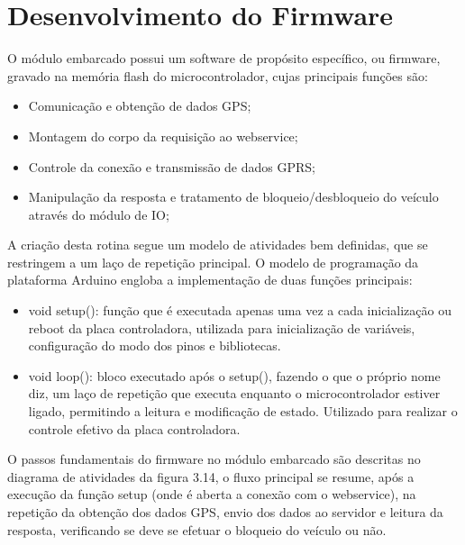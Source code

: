 \section {Desenvolvimento do Firmware}

O módulo embarcado possui um software de propósito específico, ou firmware, gravado na memória flash do microcontrolador, cujas principais funções são:

\begin{itemize}
	\item Comunicação e obtenção de dados GPS;
	\item Montagem do corpo da requisição ao webservice;
	\item Controle da conexão e transmissão de dados GPRS;
	\item Manipulação da resposta e tratamento de bloqueio/desbloqueio do veículo através do módulo de IO;
\end{itemize}

A criação desta rotina segue um modelo de atividades bem definidas, que se restringem a um laço de repetição principal. O modelo de programação da plataforma Arduino engloba a implementação de duas funções principais:

\begin{itemize}
	\item void setup(): função que é executada apenas uma vez a cada inicialização ou reboot da placa controladora, utilizada para inicialização de variáveis, configuração do modo dos pinos e bibliotecas.
	\item void loop(): bloco executado após o setup(), fazendo o que o próprio nome diz, um laço de repetição que executa enquanto o microcontrolador estiver ligado, permitindo a leitura e modificação de estado. Utilizado para realizar o controle efetivo da placa controladora.
\end{itemize} 

O passos fundamentais do firmware no módulo embarcado são descritas no diagrama de atividades da figura 3.14, o fluxo principal se resume, após a execução da função setup (onde é aberta a conexão com o webservice), na repetição da obtenção dos dados GPS, envio dos dados ao servidor e leitura da resposta, verificando se deve se efetuar o bloqueio do veículo ou não.

